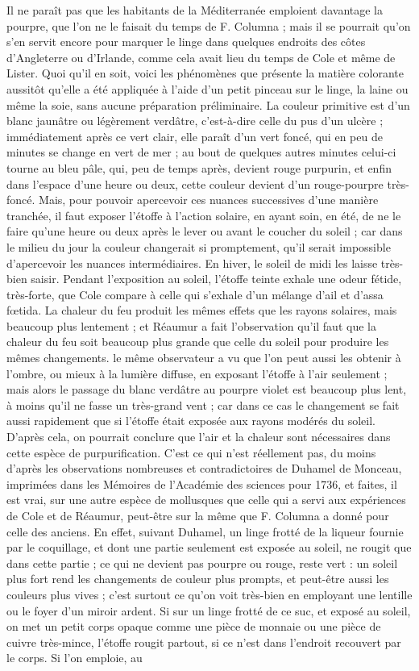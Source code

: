 \documentclass[a4paper, 11pt, oneside, polutonikogreek, french]{article}
\begin{document}
Il ne paraît pas que les habitants de la Méditerranée emploient davantage la pourpre, que l'on ne le faisait du temps de F. Columna ; mais il se pourrait qu'on s'en servit encore pour marquer le linge dans quelques endroits des côtes d'Angleterre ou d'Irlande, comme cela avait lieu du temps de Cole et même de Lister. Quoi qu'il en soit, voici les phénomènes que présente la matière colorante aussitôt qu'elle a été appliquée à l'aide d'un petit pinceau sur le linge, la laine ou même la soie, sans aucune préparation préliminaire. La couleur primitive est d'un blanc jaunâtre ou légèrement verdâtre, c'est-à-dire celle du pus d'un ulcère ; immédiatement après ce vert clair, elle paraît d'un vert foncé, qui en peu de minutes se change en vert de mer ; au bout de quelques autres minutes celui-ci tourne au bleu pâle, qui, peu de temps après, devient rouge purpurin, et enfin dans l'espace d'une heure ou deux, cette couleur devient d'un rouge-pourpre très-foncé. Mais, pour pouvoir apercevoir ces nuances successives d'une manière tranchée, il faut exposer l'étoffe à l'action solaire, en ayant soin, en été, de ne le faire qu'une heure ou deux après le lever ou avant le coucher du soleil ; car dans le milieu du jour la couleur changerait si promptement, qu'il serait impossible d'apercevoir les nuances intermédiaires. En hiver, le soleil de midi les laisse très-bien saisir. Pendant l'exposition au soleil, l'étoffe teinte exhale une odeur fétide, très-forte, que Cole compare à celle qui s'exhale d'un mélange d'ail et d'assa fœtida. La chaleur du feu produit les mêmes effets que les rayons solaires, mais beaucoup plus lentement ; et Réaumur a fait l'observation qu'il faut que la chaleur du feu soit beaucoup plus grande que celle du soleil pour produire les mêmes changements. le même observateur a vu que l'on peut aussi les obtenir à l'ombre, ou mieux à la lumière diffuse, en exposant l'étoffe à l'air seulement ; mais alors le passage du blanc verdâtre au pourpre violet est beaucoup plus lent, à moins qu'il ne fasse un très-grand vent ; car dans ce cas le changement se fait aussi rapidement que si l'étoffe était exposée aux rayons modérés du soleil. D'après cela, on pourrait conclure que l'air et la chaleur sont nécessaires dans cette espèce de purpurification. C'est ce qui n'est réellement pas, du moins d'après les observations nombreuses et contradictoires de Duhamel de Monceau, imprimées dans les Mémoires de l'Académie des sciences pour 1736, et faites, il est vrai, sur une autre espèce de mollusques que celle qui a servi aux expériences de Cole et de Réaumur, peut-être sur la même que F. Columna a donné pour celle des anciens. En effet, suivant Duhamel, un linge frotté de la liqueur fournie par le coquillage, et dont une partie seulement est exposée au soleil, ne rougit que dans cette partie ; ce qui ne devient pas pourpre ou rouge, reste vert : un soleil plus fort rend les changements de couleur plus prompts, et peut-être aussi les couleurs plus vives ; c'est surtout ce qu'on voit très-bien en employant une lentille ou le foyer d'un miroir ardent. Si sur un linge frotté de ce suc, et exposé au soleil, on met un petit corps opaque comme une pièce de monnaie ou une pièce de cuivre très-mince, l'étoffe rougit partout, si ce n'est dans l'endroit recouvert par le corps. Si l'on emploie, au 
\end{document}
